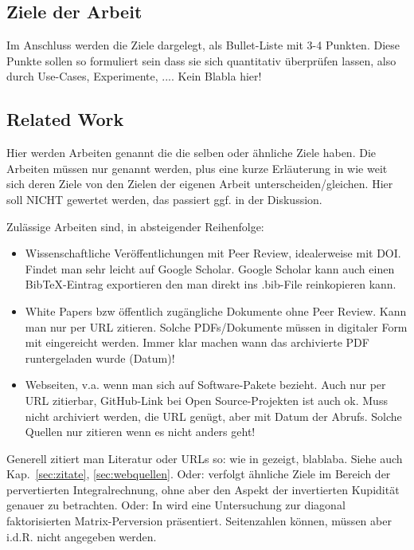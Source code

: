 \documentclass[12pt,oneside]{article}
\begin{document}
\subsection{Ziele der Arbeit}\label{sec:ziele}
Im Anschluss werden die Ziele dargelegt, als Bullet-Liste mit 3-4 Punkten. Diese Punkte sollen so formuliert sein dass sie sich quantitativ überprüfen lassen, also durch Use-Cases, Experimente, .... Kein Blabla hier!
%
\subsection{Related Work}
Hier werden Arbeiten genannt die die selben oder ähnliche Ziele haben. Die Arbeiten müssen nur genannt werden, plus eine kurze Erläuterung in wie weit sich deren Ziele von den Zielen der eigenen Arbeit unterscheiden/gleichen. Hier soll NICHT gewertet werden, das passiert ggf. in der Diskussion.

Zulässige Arbeiten sind, in absteigender Reihenfolge:
\begin{itemize}
\item Wissenschaftliche Veröffentlichungen mit Peer Review, idealerweise mit DOI. Findet man sehr leicht auf Google Scholar. Google Scholar kann auch einen BibTeX-Eintrag exportieren den man direkt ins .bib-File reinkopieren kann.
\item White Papers bzw öffentlich zugängliche Dokumente ohne Peer Review. Kann man nur per URL zitieren. Solche PDFs/Dokumente müssen in digitaler Form mit eingereicht werden. Immer klar machen wann das archivierte PDF runtergeladen wurde (Datum)!
\item Webseiten, v.a. wenn man sich auf Software-Pakete bezieht. Auch nur per URL zitierbar, GitHub-Link bei Open Source-Projekten ist auch ok. Muss nicht archiviert werden, die URL genügt, aber mit Datum der Abrufs. Solche Quellen nur zitieren wenn es nicht anders geht!
\end{itemize}

Generell zitiert man Literatur oder URLs so: wie in \cite{clemen1989combining} gezeigt, blablaba. Siehe auch Kap.~\ref{sec:zitate}, \ref{sec:webquellen}. Oder: \cite{clemen1989combining} verfolgt ähnliche Ziele im Bereich der pervertierten Integralrechnung, ohne aber den Aspekt der invertierten Kupidität genauer zu betrachten. Oder: In \cite{clemen1989combining} wird eine Untersuchung zur diagonal faktorisierten Matrix-Perversion präsentiert. Seitenzahlen können, müssen aber i.d.R. nicht angegeben werden.
\end{document}
